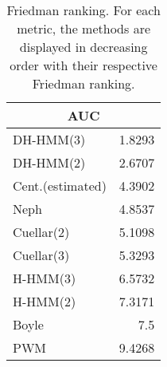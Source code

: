 \documentclass[landscape, 8pt]{report}
\begin{document}
\begin{table}[h!]
\label{tab:ranking}
\vspace{0.0cm}
\begin{center}
\caption{Friedman ranking. For each metric, the methods are displayed in decreasing order with their respective Friedman ranking.}
\renewcommand{\arraystretch}{1.2}
  \begin{tabular}{ |lr| }
    \hline
    \multicolumn{2}{|c|}{\textbf{AUC}} \\
    \hline
    DH-HMM(3) & 1.8293 \\
    DH-HMM(2) & 2.6707 \\
    Cent.(estimated) & 4.3902 \\
    Neph & 4.8537 \\
    Cuellar(2) & 5.1098 \\
    Cuellar(3) & 5.3293 \\
    H-HMM(3) & 6.5732 \\
    H-HMM(2) & 7.3171 \\
    Boyle & 7.5 \\
    PWM & 9.4268 \\
    \hline
  \end{tabular}
\end{center}
\vspace{0.0cm}
\end{table}
\end{document}
